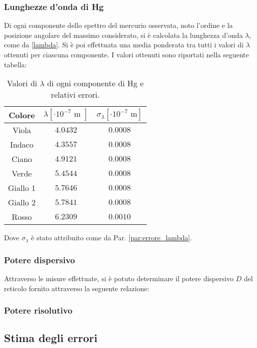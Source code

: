 \documentclass[]{article}
\let\oldsubsection\subsection%
\renewcommand{\subsection}{%
	\renewcommand{\theequation}{\thesubsection.\arabic{equation}}%
	\oldsubsection}%
\begin{document}
    \subsubsection{Lunghezze d'onda di Hg}
    Di ogni componente dello spettro del mercurio osservata, noto l'ordine e la posizione angolare del massimo considerato, si è calcolata la lunghezza d'onda $\lambda$, come da \ref{lambda}. Si è poi effettuata una media ponderata tra tutti i valori di $\lambda$ ottenuti per ciascuna componente. I valori ottenuti sono riportati nella seguente tabella:
    \begin{table} [H]
        \centering
        \begin{tabular}{||c|c|c||}
            \hline
            Colore & $\lambda [\cdot 10^{-7}\text{ m }] $ & $ \sigma_{\lambda} [\cdot 10^{-7}\text{ m}] $\\
            \hline \hline
            Viola & $ 4.0432 $ & $ 0.0008 $ \\\hline
            Indaco & $ 4.3557 $ & $ 0.0008 $ \\\hline
            Ciano & $ 4.9121 $ & $ 0.0008 $ \\\hline
            Verde & $ 5.4544 $ & $ 0.0008 $ \\\hline
            Giallo 1 & $ 5.7646 $ & $ 0.0008 $ \\\hline
            Giallo 2 & $ 5.7841 $ & $ 0.0008 $ \\\hline
            Rosso & $ 6.2309 $ & $ 0.0010 $ \\\hline
        \end{tabular}
        \caption{Valori di $\lambda$ di ogni componente di Hg e relativi errori.}
        \label{lambda-Hg-values}
    \end{table}
    Dove $\sigma_{\lambda}$ è stato attribuito come da Par. \ref{par:errore_lambda}.

    \subsubsection{Potere dispersivo}
    Attraverso le misure effettuate, si è potuto determinare il potere dispersivo $D$ del reticolo fornito attraverso la seguente relazione:

    \subsubsection{Potere risolutivo}
    


    \subsection{Stima degli errori}
\end{document}
